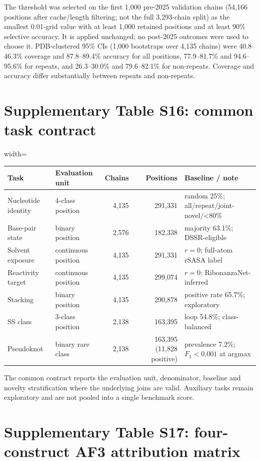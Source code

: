 \documentclass[pdflatex,sn-nature]{sn-jnl}
\begin{document}
The threshold was selected on the first 1,000 pre-2025 validation chains (54,166
positions after cache/length filtering; not the full 3,293-chain split) as the smallest
0.01-grid value with at least 1,000 retained positions and at least 90\% selective
accuracy. It is applied unchanged; no post-2025 outcomes were used to choose it. PDB-clustered 95\%
CIs (1,000 bootstraps over 4,135 chains) were 40.8--46.3\% coverage and 87.8--89.4\%
accuracy for all positions, 77.9--81.7\% and 94.6--95.6\% for repeats, and 26.3--30.0\%
and 79.6--82.1\% for non-repeats. Coverage and accuracy differ substantially between
repeats and non-repeats.

\section*{Supplementary Table S16: common task contract}

\begingroup\scriptsize
\begin{adjustbox}{width=\textwidth}
\begin{tabular}{llrrl}
\toprule
Task & Evaluation unit & Chains & Positions & Baseline / note \\
\midrule
Nucleotide identity & 4-class position & 4,135 & 291,331 & random 25\%; all/repeat/joint-novel/<80\% \\
Base-pair state & binary position & 2,576 & 182,338 & majority 63.1\%; DSSR-eligible \\
Solvent exposure & continuous position & 4,135 & 291,331 & $r=0$; full-atom rSASA label \\
Reactivity target & continuous position & 4,135 & 299,074 & $r=0$; RibonanzaNet-inferred \\
Stacking & binary position & 4,135 & 290,878 & positive rate 65.7\%; exploratory \\
SS class & 3-class position & 2,138 & 163,395 & loop 54.8\%; class-balanced \\
Pseudoknot & binary rare class & 2,138 & 163,395 (11,828 positive) & prevalence 7.2\%; $F_1<0.001$ at argmax \\
\bottomrule
\end{tabular}
\end{adjustbox}
\endgroup

The common contract reports the evaluation unit, denominator, baseline and novelty
stratification where the underlying joins are valid. Auxiliary tasks remain exploratory
and are not pooled into a single benchmark score.

\section*{Supplementary Table S17: four-construct AF3 attribution matrix}
\end{document}
